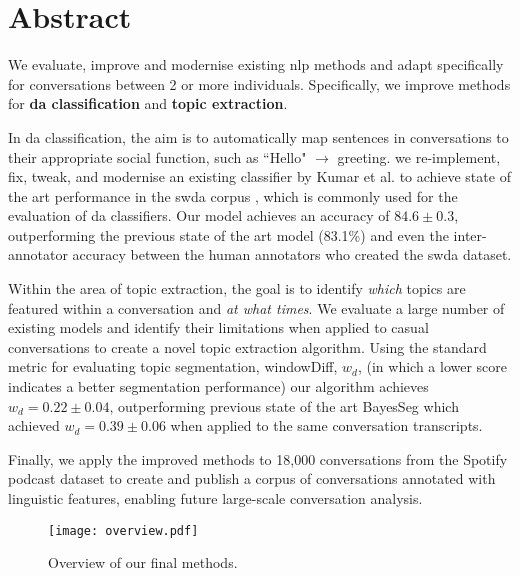 \chapter*{Abstract}
\thispagestyle{empty}
We evaluate, improve and modernise existing \gls{nlp} methods and adapt specifically for conversations between 2 or more individuals. Specifically, we improve methods for \textbf{\gls{da} classification} and \textbf{topic extraction}.

In \gls{da} classification, the aim is to automatically map sentences in conversations to their appropriate social function, such as ``Hello" $\rightarrow$ greeting. we re-implement, fix, tweak, and modernise an existing classifier by Kumar et al.\cite{kumar2017dialogue} to achieve state of the art performance in the \gls{swda} corpus \cite{swda}, which is commonly used for the evaluation of \gls{da} classifiers.
Our model achieves an accuracy of $\mathbf{84.6 \pm 0.3}$, outperforming the previous state of the art model (83.1\%)\cite{ravi2018self} and even the inter-annotator accuracy between the human annotators who created the \gls{swda} dataset\cite{swda}.

Within the area of topic extraction, the goal is to identify \textit{which} topics are featured within a conversation and \textit{at what times}. We evaluate a large number of existing models and identify their limitations when applied to casual conversations to create a novel topic extraction algorithm.
Using the standard metric for evaluating topic segmentation, windowDiff, $w_d$, (in which a lower score indicates a better segmentation performance) our algorithm achieves $w_d = \mathbf{0.22 \pm 0.04}$, outperforming previous state of the art BayesSeg\cite{eisenstein2008bayesian} which achieved $w_d = 0.39 \pm 0.06$ when applied to the same conversation transcripts.

Finally, we apply the improved methods to 18,000 conversations from the Spotify podcast dataset\cite{clifton-2020100000} to create and publish a corpus of conversations annotated with linguistic features, enabling future large-scale conversation analysis.

\begin{figure}
    \centering
    \texttt{[image: overview.pdf]}
    \caption{Overview of our final methods.}
    \label{fig:overview}
\end{figure}
\glsresetall
\newpage